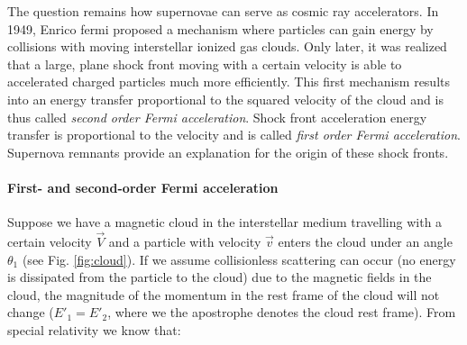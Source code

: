 The question remains how supernovae can serve as cosmic ray accelerators. In 1949, Enrico fermi proposed a mechanism where particles can gain energy by collisions with moving interstellar ionized gas clouds. Only later, it was realized that a large, plane shock front moving with a certain velocity is able to accelerated charged particles much more efficiently. This first mechanism results into an energy transfer proportional to the squared velocity of the cloud and is thus called \textit{second order Fermi acceleration}. Shock front acceleration energy transfer is proportional to the velocity and is called \textit{first order Fermi acceleration}. Supernova remnants provide an explanation for the origin of these shock fronts.

\paragraph{First- and second-order Fermi acceleration}
\label{para:fermiacceleration}

Suppose we have a magnetic cloud in the interstellar medium travelling with a certain velocity $\vec{V}$ and a particle with velocity $\vec{v}$ enters the cloud under an angle $\theta_1$ (see Fig. \ref{fig:cloud}). If we assume collisionless scattering can occur (no energy is dissipated from the particle to the cloud) due to the magnetic fields in the cloud, the magnitude of the momentum in the rest frame of the cloud will not change ($E'_1 = E'_2$, where we the apostrophe denotes the cloud rest frame). From special relativity we know that:

